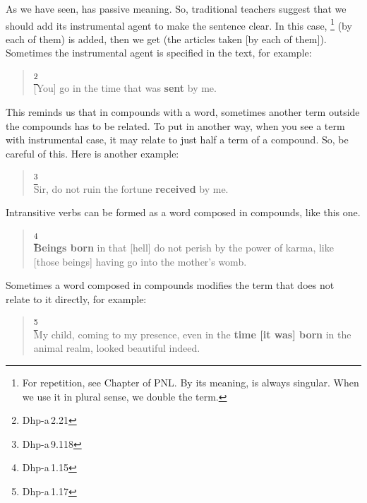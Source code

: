 As we have seen,  has passive meaning. So, traditional teachers suggest that we should add its instrumental agent to make the sentence clear. In this case, \footnote{For repetition, see Chapter  of PNL. By its meaning,  is always singular. When we use it in plural sense, we double the term.} (by each of them) is added, then we get  (the articles taken [by each of them]). Sometimes the instrumental agent is specified in the text, for example:

\begin{quote}
\footnote{Dhp-a\,2.21}\\
{[You]} go in the time that was \textbf{sent} by me.
\end{quote}

This reminds us that in compounds with a  word, sometimes another term outside the compounds has to be related. To put in another way, when you see a term with instrumental case, it may relate to just half a term of a compound. So, be careful of this. Here is another example:

\begin{quote}
\footnote{Dhp-a\,9.118}\\
Sir, do not ruin the fortune \textbf{received} by me.
\end{quote}

Intransitive verbs can be formed as a  word composed in compounds, like this one.

\begin{quote}
\footnote{Dhp-a\,1.15}\\
\textbf{Beings born} in that [hell] do not perish by the power of karma, like [those beings] having go into the mother's womb.
\end{quote}

Sometimes a  word composed in compounds modifies the term that does not relate to it directly, for example:

\begin{quote}
\footnote{Dhp-a\,1.17}\\
My child, coming to my presence, even in the \textbf{time [it was] born} in the animal realm, looked beautiful indeed.
\end{quote}

